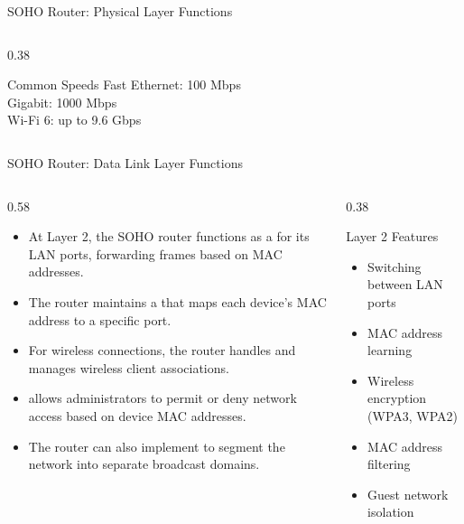 \documentclass[aspectratio=169]{beamer}  %
\begin{document}
\begin{frame}{SOHO Router: Physical Layer Functions}
\begin{columns}[T]
\begin{column}{0.38\textwidth}
            \vspace{0.3em}
            \begin{exampleblock}{Common Speeds}
                \small
                Fast Ethernet: 100 Mbps \\
                Gigabit: 1000 Mbps \\
                Wi-Fi 6: up to 9.6 Gbps
            \end{exampleblock}
        \end{column}
    \end{columns}
\end{frame}

\begin{frame}{SOHO Router: Data Link Layer Functions}
    \begin{columns}[T]
        \begin{column}{0.58\textwidth}
            \begin{itemize}
                \small
                \item At Layer 2, the SOHO router functions as a  for its LAN ports, forwarding frames based on MAC addresses.
                \item The router maintains a  that maps each device's MAC address to a specific port.
                \item For wireless connections, the router handles  and manages wireless client associations.
                \item {} allows administrators to permit or deny network access based on device MAC addresses.
                \item The router can also implement  to segment the network into separate broadcast domains.
            \end{itemize}
        \end{column}
        \begin{column}{0.38\textwidth}
            \begin{block}{Layer 2 Features}
                \begin{itemize}
                    \item Switching between LAN ports
                    \item MAC address learning
                    \item Wireless encryption (WPA3, WPA2)
                    \item MAC address filtering
                    \item Guest network isolation
                \end{itemize}
            \end{block}
            

\end{column}
\end{columns}
\end{frame}
\end{document}
